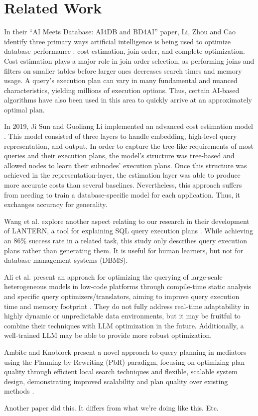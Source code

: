 \section{Related Work}
In their ``AI Meets Database: AI4DB and BD4AI'' paper, Li, Zhou and Cao identify three primary ways artificial intelligence is being used to optimize database performance \cite{li2021}: cost estimation, join order, and complete optimization. Cost estimation plays a major role in join order selection, as performing joins and filters on smaller tables before larger ones decreases search times and memory usage. A query's execution plan can vary in many fundamental and nuanced characteristics, yielding millions of execution options. Thus, certain AI-based algorithms have also been used in this area to quickly arrive at an approximately optimal plan.

In 2019, Ji Sun and Guoliang Li implemented an advanced cost estimation model \cite{sun2019}. This model consisted of three layers to handle embedding, high-level query representation, and output. In order to capture the tree-like requirements of most queries and their execution plans, the model's structure was tree-based and allowed nodes to learn their subnodes' execution plans. Once this structure was achieved in the representation-layer, the estimation layer was able to produce more accurate costs than several baselines. Nevertheless, this approach suffers from needing to train a database-specific model for each application. Thus, it exchanges accuracy for generality.

Wang et al. explore another aspect relating to our research in their development of LANTERN, a tool for explaining SQL query execution plans \cite{wang2021}. While achieving an 86\% success rate in a related task, this study only describes query execution plans rather than generating them. It is useful for human learners, but not for database management systems (DBMS).

Ali et al. present an approach for optimizing the querying of large-scale heterogeneous models in low-code platforms through compile-time static analysis and specific query optimizers/translators, aiming to improve query execution time and memory footprint \cite{Ali2020EfficientlyQM}. They do not fully address real-time adaptability in highly dynamic or unpredictable data environments, but it may be fruitful to combine their techniques with LLM optimization in the future. Additionally, a well-trained LLM may be able to provide more robust optimization.

Ambite and Knoblock present a novel approach to query planning in mediators using the Planning by Rewriting (PbR) paradigm, focusing on optimizing plan quality through efficient local search techniques and flexible, scalable system design, demonstrating improved scalability and plan quality over existing methods \cite{Ambite2000FlexibleQP}. 

Another paper did this. It differs from what we're doing like this. Etc.
